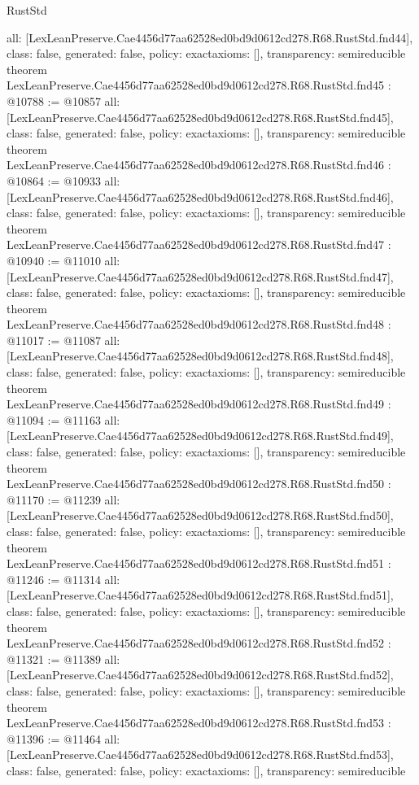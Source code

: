 \begin{lexlean}{RustStd}
\begin{coremodule}
{  all: [LexLeanPreserve.Cae4456d77aa62528ed0bd9d0612cd278.R68.RustStd.fnd44],
  class: false,
  generated: false,
  policy: exact{axioms: []},
  transparency: semireducible
}
theorem LexLeanPreserve.Cae4456d77aa62528ed0bd9d0612cd278.R68.RustStd.fnd45 : @10788 := @10857 {
  all: [LexLeanPreserve.Cae4456d77aa62528ed0bd9d0612cd278.R68.RustStd.fnd45],
  class: false,
  generated: false,
  policy: exact{axioms: []},
  transparency: semireducible
}
theorem LexLeanPreserve.Cae4456d77aa62528ed0bd9d0612cd278.R68.RustStd.fnd46 : @10864 := @10933 {
  all: [LexLeanPreserve.Cae4456d77aa62528ed0bd9d0612cd278.R68.RustStd.fnd46],
  class: false,
  generated: false,
  policy: exact{axioms: []},
  transparency: semireducible
}
theorem LexLeanPreserve.Cae4456d77aa62528ed0bd9d0612cd278.R68.RustStd.fnd47 : @10940 := @11010 {
  all: [LexLeanPreserve.Cae4456d77aa62528ed0bd9d0612cd278.R68.RustStd.fnd47],
  class: false,
  generated: false,
  policy: exact{axioms: []},
  transparency: semireducible
}
theorem LexLeanPreserve.Cae4456d77aa62528ed0bd9d0612cd278.R68.RustStd.fnd48 : @11017 := @11087 {
  all: [LexLeanPreserve.Cae4456d77aa62528ed0bd9d0612cd278.R68.RustStd.fnd48],
  class: false,
  generated: false,
  policy: exact{axioms: []},
  transparency: semireducible
}
theorem LexLeanPreserve.Cae4456d77aa62528ed0bd9d0612cd278.R68.RustStd.fnd49 : @11094 := @11163 {
  all: [LexLeanPreserve.Cae4456d77aa62528ed0bd9d0612cd278.R68.RustStd.fnd49],
  class: false,
  generated: false,
  policy: exact{axioms: []},
  transparency: semireducible
}
theorem LexLeanPreserve.Cae4456d77aa62528ed0bd9d0612cd278.R68.RustStd.fnd50 : @11170 := @11239 {
  all: [LexLeanPreserve.Cae4456d77aa62528ed0bd9d0612cd278.R68.RustStd.fnd50],
  class: false,
  generated: false,
  policy: exact{axioms: []},
  transparency: semireducible
}
theorem LexLeanPreserve.Cae4456d77aa62528ed0bd9d0612cd278.R68.RustStd.fnd51 : @11246 := @11314 {
  all: [LexLeanPreserve.Cae4456d77aa62528ed0bd9d0612cd278.R68.RustStd.fnd51],
  class: false,
  generated: false,
  policy: exact{axioms: []},
  transparency: semireducible
}
theorem LexLeanPreserve.Cae4456d77aa62528ed0bd9d0612cd278.R68.RustStd.fnd52 : @11321 := @11389 {
  all: [LexLeanPreserve.Cae4456d77aa62528ed0bd9d0612cd278.R68.RustStd.fnd52],
  class: false,
  generated: false,
  policy: exact{axioms: []},
  transparency: semireducible
}
theorem LexLeanPreserve.Cae4456d77aa62528ed0bd9d0612cd278.R68.RustStd.fnd53 : @11396 := @11464 {
  all: [LexLeanPreserve.Cae4456d77aa62528ed0bd9d0612cd278.R68.RustStd.fnd53],
  class: false,
  generated: false,
  policy: exact{axioms: []},
  transparency: semireducible
}
\end{coremodule}
\end{lexlean}
